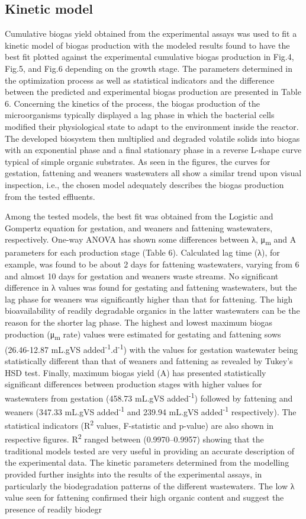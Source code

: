 \subsection{Kinetic model}
Cumulative biogas yield obtained from the experimental assays was used to fit a kinetic model of biogas production with the modeled results found to have the best fit plotted against the experimental cumulative biogas production in Fig.4, Fig.5, and Fig.6 depending on the growth stage. The parameters determined in the optimization process as well as statistical indicators and the difference between the predicted and experimental biogas production are presented in Table 6.
Concerning the kinetics of the process, the biogas production of the microorganisms typically displayed a lag phase in which the bacterial cells modified their physiological state to adapt to the environment inside the reactor. The developed biosystem then multiplied and degraded volatile solids into biogas with an exponential phase and a final stationary phase in a reverse L-shape curve typical of simple organic substrates. As seen in the figures, the curves for gestation, fattening and weaners wastewaters all show a similar trend upon visual inspection, i.e., the chosen model adequately describes the biogas production from the tested effluents. 

Among the tested models, the best fit was obtained from the Logistic and Gompertz equation for gestation, and weaners and fattening wastewaters, respectively. One-way ANOVA has shown some differences between λ, μ\textsubscript{m} and A  parameters for each production stage (Table 6). Calculated lag time (λ), for example, was found to be about 2 days for fattening wastewaters, varying from 6 and almost 10 days for gestation and weaners waste streams. No significant difference in λ values was found for gestating and fattening wastewaters, but the lag phase for weaners was significantly higher than that for fattening. The high bioavailability of readily degradable organics in the latter wastewaters can be the reason for the shorter lag phase. The highest and lowest maximum biogas production (μ\textsubscript{m} rate) values were estimated for gestating and fattening sows (26.46-12.87 mL.gVS added\textsuperscript{-1}.d\textsuperscript{-1}) with the values for gestation wastewater being statistically different than that of weaners and fattening as revealed by Tukey’s HSD test. Finally, maximum biogas yield (A) has presented statistically significant differences between production stages with higher values for wastewaters from gestation (458.73 mL.gVS added\textsuperscript{-1}) followed by fattening and weaners (347.33 mL.gVS added\textsuperscript{-1} and 239.94 mL.gVS added\textsuperscript{-1} respectively). The statistical indicators (R\textsuperscript{2} values, F-statistic and p-value) are also shown in respective figures. R\textsuperscript{2} ranged between (0.9970–0.9957) showing that the traditional models tested are very useful in providing an accurate description of the experimental data. The kinetic parameters determined from the modelling provided further insights into the results of the experimental assays, in particularly the biodegradation patterns of the different wastewaters. The low λ value seen for fattening confirmed their high organic content and suggest the presence of readily biodegr